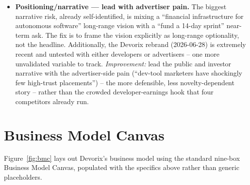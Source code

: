 \begin{itemize}
  \item \textbf{Positioning/narrative --- lead with advertiser pain.} The biggest narrative risk, already self-identified, is mixing a ``financial infrastructure for autonomous software'' long-range vision with a ``fund a 14-day sprint'' near-term ask. The fix is to frame the vision explicitly as long-range optionality, not the headline. Additionally, the Devorix rebrand (2026-06-28) is extremely recent and untested with either developers or advertisers -- one more unvalidated variable to track. \textit{Improvement:} lead the public and investor narrative with the advertiser-side pain (``dev-tool marketers have shockingly few high-trust placements'') -- the more defensible, less novelty-dependent story -- rather than the crowded developer-earnings hook that four competitors already run.
\end{itemize}

\section{Business Model Canvas}
\label{sec:bmc}

Figure~\ref{fig:bmc} lays out Devorix's business model using the standard nine-box Business Model Canvas, populated with the specifics above rather than generic placeholders.

